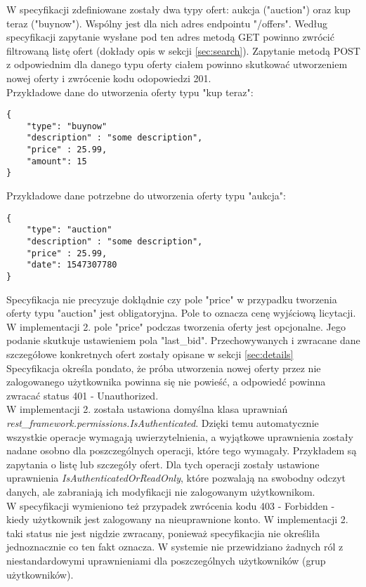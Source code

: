 \documentclass[12pt, notitlepage]{article}
\begin{document}
W specyfikacji zdefiniowane zostały dwa typy ofert: aukcja ("auction") oraz kup teraz ("buynow"). Wspólny jest dla nich adres endpointu "/offers". Według specyfikacji zapytanie wysłane pod ten adres metodą GET powinno zwrócić filtrowaną listę ofert (dokłady opis w sekcji \ref{sec:search}). Zapytanie metodą POST z odpowiednim dla danego typu oferty ciałem powinno skutkować utworzeniem nowej oferty i zwrócenie kodu odopowiedzi 201. \\

Przykładowe dane do utworzenia oferty typu "kup teraz":
\begin{lstlisting}
{     
    "type": "buynow"
    "description" : "some description",
    "price" : 25.99,
    "amount": 15
}
\end{lstlisting}

Przykładowe dane potrzebne do utworzenia oferty typu "aukcja":
\begin{lstlisting}
{     
    "type": "auction"
    "description" : "some description",
    "price" : 25.99,
    "date": 1547307780
}
\end{lstlisting}

Specyfikacja nie precyzuje dokłądnie czy pole "price" w przypadku tworzenia oferty typu "auction" jest obligatoryjna. Pole to oznacza cenę wyjściową licytacji. 
W implementacji 2. pole "price" podczas tworzenia oferty jest opcjonalne. Jego podanie skutkuje ustawieniem pola "last\_bid". Przechowywanych i zwracane dane szczegółowe konkretnych ofert zostały opisane w sekcji \ref{sec:details} \\

Specyfikacja określa pondato, że próba utworzenia nowej oferty przez nie zalogowanego użytkownika powinna się nie powieść, a odpowiedć powinna zwracać status 401 - Unauthorized. \\
W implementacji 2. została ustawiona domyślna klasa uprawniań \textit{rest\_framework.permissions.IsAuthenticated}. Dzięki temu automatycznie wszystkie operacje wymagają uwierzytelnienia, a wyjątkowe uprawnienia zostały nadane osobno dla poszczególnych operacji, które tego wymagały. Przykładem są zapytania o listę lub szczegóły ofert. Dla tych operacji zostały ustawione uprawnienia \textit{IsAuthenticatedOrReadOnly}, które pozwalają na swobodny odczyt danych, ale zabraniają ich modyfikacji nie zalogowanym użytkownikom. \\

W specyfikacji wymieniono też przypadek zwrócenia kodu 403 - Forbidden - kiedy użytkownik jest zalogowany na nieuprawnione konto. W implementacji 2. taki status nie jest nigdzie zwracany, ponieważ specyfikacjia nie określiła jednoznacznie co ten fakt oznacza. W systemie nie przewidziano żadnych ról z niestandardowymi uprawnieniami dla poszczególnych użytkowników (grup użytkowników). \\
\end{document}
